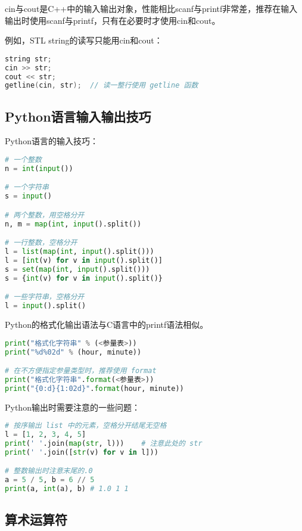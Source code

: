 cin与cout是C++中的输入输出对象，性能相比scanf与printf非常差，推荐在输入输出时使用scanf与printf，只有在必要时才使用cin和cout。

例如，STL string的读写只能用cin和cout：

\begin{lstlisting}[language=c++]
string str;	
cin >> str;
cout << str;
getline(cin, str);	// 读一整行使用 getline 函数
\end{lstlisting}

\subsection{Python语言输入输出技巧}

Python语言的输入技巧：

\begin{lstlisting}[language=python]
# 一个整数
n = int(input())

# 一个字符串
s = input()

# 两个整数，用空格分开
n, m = map(int, input().split())

# 一行整数，空格分开
l = list(map(int, input().split()))
l = [int(v) for v in input().split()]
s = set(map(int, input().split()))
s = {int(v) for v in input().split()}

# 一些字符串，空格分开
l = input().split()
\end{lstlisting}

Python的格式化输出语法与C语言中的printf语法相似。

\begin{lstlisting}[language=python]
print("格式化字符串" % (<参量表>))
print("%d%02d" % (hour, minute))

# 在不方便指定参量类型时，推荐使用 format
print("格式化字符串".format(<参量表>))
print("{0:d}{1:02d}".format(hour, minute))
\end{lstlisting}

Python输出时需要注意的一些问题：

\begin{lstlisting}[language=python]
# 按序输出 list 中的元素，空格分开结尾无空格
l = [1, 2, 3, 4, 5]
print(' '.join(map(str, l)))	# 注意此处的 str
print(' '.join([str(v) for v in l]))

# 整数输出时注意末尾的.0
a = 5 / 5, b = 6 // 5
print(a, int(a), b)	# 1.0 1 1
\end{lstlisting}

\subsection{算术运算符}

